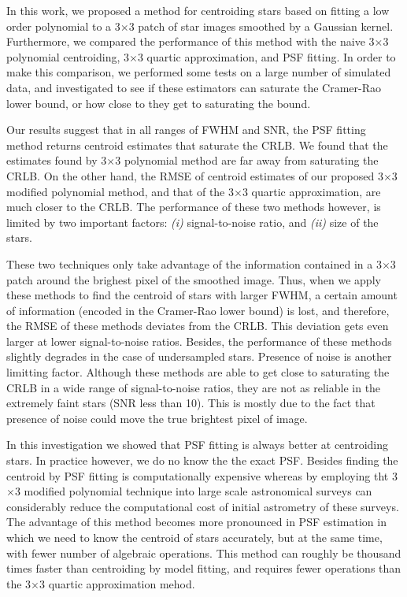 \documentclass[12pt, preprint]{aastex}
\begin{document}
In this work, we proposed a method for centroiding stars based on fitting a low order polynomial to a 3$\times$3 patch of star images smoothed by a Gaussian kernel. 
Furthermore, we compared the performance of this method with the naive 3$\times$3 polynomial centroiding, 3$\times$3 quartic approximation, and PSF fitting.
In order to make this comparison, we performed some tests on a large number of simulated data, and investigated to see if these estimators can saturate the Cramer-Rao lower bound, or how close to they get to saturating the bound. 

Our results suggest that in all ranges of FWHM and SNR, the PSF fitting method returns centroid estimates that saturate the CRLB. We found that the estimates found by 3$\times$3 polynomial method are far away from saturating the CRLB. On the other hand, the RMSE of centroid estimates of our proposed 3$\times$3 modified polynomial method, and that of the 3$\times$3 quartic approximation, are much closer to the CRLB. The performance of these two methods however, is limited by two important factors: \emph{(i)} signal-to-noise ratio, and \emph{(ii)} size of the stars.

These two techniques only take advantage of the information contained in a 3$\times$3 patch around the brighest pixel of the smoothed image. Thus, when we apply 
these methods to find the centroid of stars with larger FWHM, a certain amount of information (encoded in the Cramer-Rao lower bound) is lost, and therefore, the RMSE of these methods deviates from the CRLB. This deviation gets even larger at lower signal-to-noise ratios. Besides, the performance of these methods slightly degrades in the case of undersampled stars. Presence of noise is another limitting factor. Although these methods are able to get close to saturating the CRLB in a wide range of signal-to-noise ratios, they are not as reliable in the extremely faint stars (SNR less than 10). This is mostly due to the fact that presence of noise could move the true brightest pixel of image. 

In this investigation we showed that PSF fitting is always better at centroiding stars. In practice however, we do no know the the exact PSF. Besides finding the centroid by PSF fitting is computationally expensive whereas by employing tht 3$\times$3 modified polynomial technique into large scale astronomical surveys can considerably reduce the computational cost of initial astrometry of these surveys. The advantage of this method becomes more pronounced in PSF estimation in which we need to know the centroid of stars accurately, but at the same time, with fewer number of algebraic operations. This method can roughly be thousand times faster than centroiding by model fitting, and requires fewer operations than the 3$\times$3 quartic approximation mehod.
     
\end{document}
